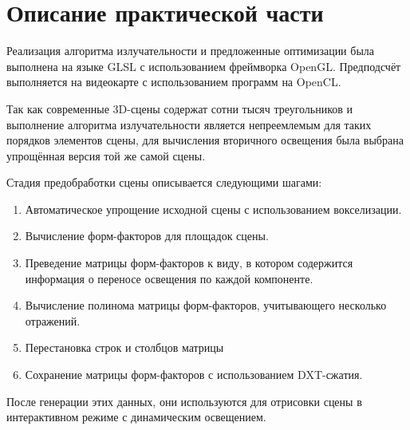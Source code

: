 \documentclass[12pt,fleqn]{article}
\begin{document}
\pagebreak

\section{Описание практической части}

Реализация алгоритма излучательности и предложенные оптимизации была выполнена на языке GLSL с использованием фреймворка OpenGL. Предподсчёт выполняется на видеокарте с использованием программ на OpenCL. 

Так как современные 3D-сцены содержат сотни тысяч треугольников и выполнение алгоритма излучательности является непреемлемым для таких порядков элементов сцены, для вычисления вторичного освещения была выбрана упрощённая версия той же самой сцены.

Стадия предобработки сцены описывается следующими шагами:

\begin{enumerate}

\item Автоматическое упрощение исходной сцены с использованием вокселизации.

\item Вычисление форм-факторов для площадок сцены.

\item Преведение матрицы форм-факторов к виду, в котором содержится информация о переносе освещения по каждой компоненте.

\item Вычисление полинома матрицы форм-факторов, учитывающего несколько отражений.

\item Перестановка строк и столбцов матрицы

\item Сохранение матрицы форм-факторов с использованием DXT-сжатия.

\end{enumerate}

После генерации этих данных, они используются для отрисовки сцены в интерактивном режиме с динамическим освещением.
\end{document}
